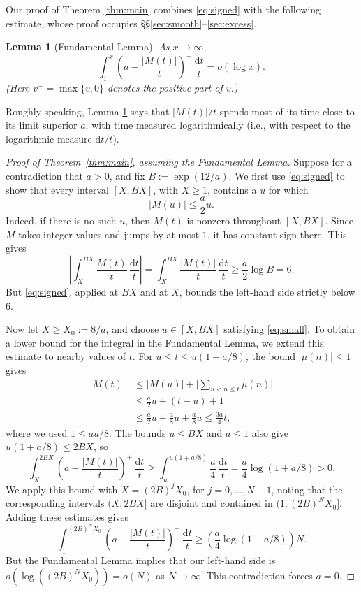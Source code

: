 \documentclass[11pt]{amsart}
\newtheorem{lemma}[theorem]{Lemma}
\theoremstyle{remark}
\newcommand{\dt}{\,\frac{\mathrm{d}t}{t}}
\newcommand{\pos}[1]{\left(#1\right)^+}
\begin{document}
Our proof of Theorem \ref{thm:main} combines \eqref{eq:signed} with the following estimate, whose
proof occupies \S\S\ref{sec:smooth}--\ref{sec:excess}.
\begin{lemma}[Fundamental Lemma]\label{lem:fundamental}
As $x\to\infty$,
\[
\int_1^x\pos{a-\frac{|M(t)|}{t}}\dt=o(\log x).
\]
{\rm (}Here $v^+=\max\{v,0\}$ denotes the positive part of $v$.{\rm )}
\end{lemma}

Roughly speaking, Lemma \ref{lem:fundamental} says that $|M(t)|/t$ spends most of its time close to its limit superior $a$, with time measured logarithmically (i.e., with respect to the logarithmic measure $\mathrm{d}t/t$).

\begin{proof}[Proof of Theorem~\ref{thm:main}, assuming the Fundamental Lemma]
Suppose for a contradiction that $a>0$, and fix $B:=\exp(12/a)$.
We first use \eqref{eq:signed} to show that every interval $[X,BX]$,
with $X\ge1$, contains a $u$ for which
\begin{equation}\label{eq:small}
|M(u)|\le\frac a2u.
\end{equation}
Indeed, if there is no such $u$, then $M(t)$ is nonzero
throughout $[X,BX]$. Since $M$ takes integer values and jumps by
at most $1$, it has constant sign there. This gives
\[
\left|\int_X^{BX}\frac{M(t)}t\dt\right|
=\int_X^{BX}\frac{|M(t)|}t\dt
\ge\frac a2\log B=6.
\]
But \eqref{eq:signed}, applied at $BX$ and at $X$, bounds the
left-hand side strictly below $6$.

Now let $X\ge X_0:=8/a$, and choose $u\in[X,BX]$ satisfying
\eqref{eq:small}. To obtain a lower bound for the integral in the
Fundamental Lemma, we extend this estimate to nearby values of $t$.
For $u\le t\le u(1+a/8)$, the bound $|\mu(n)|\le1$ gives
\[
\begin{aligned}
|M(t)|
&\le |M(u)|+\bigg|\sum_{u<n\le t}\mu(n)\bigg|\\
&\le\frac a2u+(t-u)+1\\
&\le\frac a2u+\frac a8u+\frac a8u
\le\frac{3a}{4}t,
\end{aligned}
\]
where we used $1\le au/8$. The bounds $u\le BX$ and $a\le1$ also
give $u(1+a/8)\le2BX$, so
\[
\int_X^{2BX}\pos{a-\frac{|M(t)|}t}\dt
\ge\int_u^{u(1+a/8)}\frac a4\dt
=\frac a4\log(1+a/8)>0.
\]
We apply this bound with $X=(2B)^{j} X_0$, for $j=0,\ldots, N-1$, noting that the corresponding intervals $(X,2BX]$ are disjoint and contained in $(1,(2B)^{N} X_0]$. Adding these estimates gives
\[
\int_1^{(2B)^NX_0}\pos{a-\frac{|M(t)|}t}\dt
\ge \left(\frac a4\log(1+a/8)\right)N.
\]
But the Fundamental Lemma implies that our left-hand side is $o(\log((2B)^NX_0))=o(N)$ as $N\to\infty$. This contradiction forces $a=0$.
\end{proof}
\end{document}
